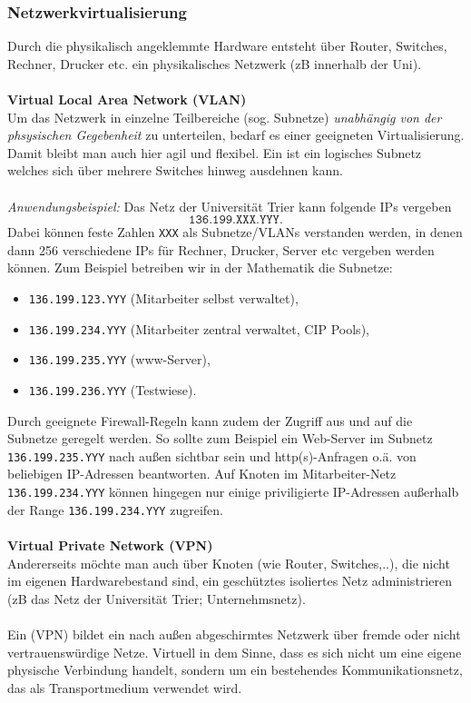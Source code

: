 \subsubsection{Netzwerkvirtualisierung}
Durch die physikalisch angeklemmte Hardware entsteht über Router, Switches, Rechner, Drucker etc. ein physikalisches Netzwerk (zB innerhalb der Uni).\\~\\
\textbf{Virtual Local Area Network (VLAN)}\\
Um das Netzwerk in einzelne Teilbereiche (sog. Subnetze) \textit{unabhängig von der phsysischen Gegebenheit} zu unterteilen, bedarf es einer geeigneten Virtualisierung. Damit bleibt man auch hier agil und flexibel. Ein  ist ein logisches Subnetz welches sich über mehrere Switches hinweg ausdehnen kann.\\~\\
\textit{Anwendungsbeispiel:} Das Netz der Universität Trier kann folgende IPs vergeben $$\texttt{136.199.XXX.YYY}.$$ Dabei können feste Zahlen \texttt{XXX} als Subnetze/VLANs verstanden werden, in denen dann 256 verschiedene IPs für Rechner, Drucker, Server etc vergeben werden können. Zum Beispiel betreiben wir in der Mathematik die Subnetze:
\begin{itemize}
	\item \texttt{136.199.123.YYY} (Mitarbeiter selbst verwaltet), 
	\item \texttt{136.199.234.YYY} (Mitarbeiter zentral verwaltet, CIP Pools), 
	\item \texttt{136.199.235.YYY} (www-Server), 
	\item \texttt{136.199.236.YYY} (Testwiese).
\end{itemize}
Durch geeignete Firewall-Regeln kann zudem der Zugriff aus und auf die Subnetze geregelt werden. So sollte zum Beispiel ein Web-Server im Subnetz \texttt{136.199.235.YYY} nach außen sichtbar sein und http(s)-Anfragen o.ä. von beliebigen IP-Adressen beantworten. Auf Knoten im Mitarbeiter-Netz \texttt{136.199.234.YYY} können hingegen nur einige priviligierte IP-Adressen außerhalb der Range \texttt{136.199.234.YYY} zugreifen.
~\\~\\
\textbf{Virtual Private Network (VPN)}\\
Andererseits möchte man auch über Knoten (wie Router, Switches,..), die nicht im eigenen Hardwarebestand sind, ein geschütztes isoliertes Netz administrieren (zB das Netz der Universität Trier; Unternehmsnetz).\\~\\ Ein  (VPN) bildet ein nach außen abgeschirmtes Netzwerk über fremde oder nicht vertrauenswürdige Netze. Virtuell in dem Sinne, dass es sich nicht um eine eigene physische Verbindung handelt, sondern um ein bestehendes Kommunikationsnetz, das als Transportmedium verwendet wird.\\
